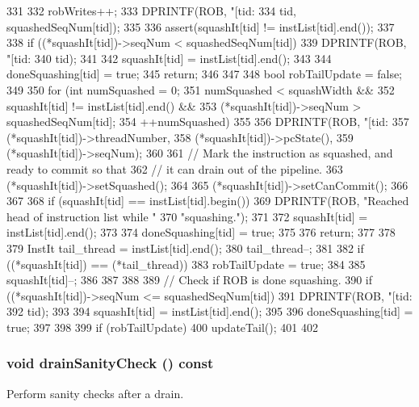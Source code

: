 \begin{DoxyCode}
331 {
332     robWrites++;
333     DPRINTF(ROB, "[tid:%
334             tid, squashedSeqNum[tid]);
335 
336     assert(squashIt[tid] != instList[tid].end());
337 
338     if ((*squashIt[tid])->seqNum < squashedSeqNum[tid]) {
339         DPRINTF(ROB, "[tid:%
340                 tid);
341 
342         squashIt[tid] = instList[tid].end();
343 
344         doneSquashing[tid] = true;
345         return;
346     }
347 
348     bool robTailUpdate = false;
349 
350     for (int numSquashed = 0;
351          numSquashed < squashWidth &&
352          squashIt[tid] != instList[tid].end() &&
353          (*squashIt[tid])->seqNum > squashedSeqNum[tid];
354          ++numSquashed)
355     {
356         DPRINTF(ROB, "[tid:%
357                 (*squashIt[tid])->threadNumber,
358                 (*squashIt[tid])->pcState(),
359                 (*squashIt[tid])->seqNum);
360 
361         // Mark the instruction as squashed, and ready to commit so that
362         // it can drain out of the pipeline.
363         (*squashIt[tid])->setSquashed();
364 
365         (*squashIt[tid])->setCanCommit();
366 
367 
368         if (squashIt[tid] == instList[tid].begin()) {
369             DPRINTF(ROB, "Reached head of instruction list while "
370                     "squashing.\n");
371 
372             squashIt[tid] = instList[tid].end();
373 
374             doneSquashing[tid] = true;
375 
376             return;
377         }
378 
379         InstIt tail_thread = instList[tid].end();
380         tail_thread--;
381 
382         if ((*squashIt[tid]) == (*tail_thread))
383             robTailUpdate = true;
384 
385         squashIt[tid]--;
386     }
387 
388 
389     // Check if ROB is done squashing.
390     if ((*squashIt[tid])->seqNum <= squashedSeqNum[tid]) {
391         DPRINTF(ROB, "[tid:%
392                 tid);
393 
394         squashIt[tid] = instList[tid].end();
395 
396         doneSquashing[tid] = true;
397     }
398 
399     if (robTailUpdate) {
400         updateTail();
401     }
402 }
\end{DoxyCode}
\hypertarget{classROB_a0240eb42fa57fe5d3788093f62b77347}{
\subsubsection[{drainSanityCheck}]{\setlength{\rightskip}{0pt plus 5cm}void drainSanityCheck () const}}
\label{classROB_a0240eb42fa57fe5d3788093f62b77347}
Perform sanity checks after a drain. 


